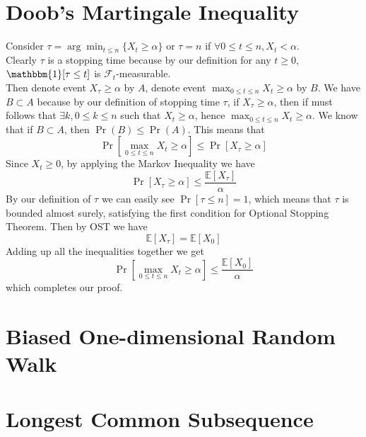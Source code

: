 \documentclass[12pt,letterpaper]{article}
\begin{document}
\section{Doob's Martingale Inequality}
Consider $\tau=\arg\min_{t\leq n}\{X_t\geq\alpha\}$ or $\tau=n$ if $\forall 0\leq t\leq n, X_t<\alpha$.\\
Clearly $\tau$ is a stopping time because by our definition 
for any $t\geq 0$, $\mathbbm{1}[\tau\leq t]$ is $\mathcal{F}_t$-measurable.\\
Then denote event $X_{\tau}\geq\alpha$ by $A$,
denote event $\max_{0\leq t\leq n}X_t\geq\alpha$ by $B$.
We have $B\subset A$ because by our definition of stopping time $\tau$,
if $X_{\tau}\geq\alpha$,
then if must follows that $\exists k, 0\leq k\leq n$ such that $X_t\geq\alpha$,
hence $\max_{0\leq t\leq n}X_t\geq\alpha$.
We know that if $B\subset A$, then $\Pr(B)\leq\Pr(A)$.
This means that
$$\Pr \left[\max_{0\leq t\leq n}X_t\geq\alpha\right]\leq \Pr\left[X_{\tau}\geq\alpha\right]$$
Since $X_t\geq 0$, by applying the Markov Inequality we have
$$\Pr\left[X_{\tau}\geq\alpha\right]\leq \frac{\mathbb{E}\left[X_{\tau}\right]}{\alpha}$$
By our definition of $\tau$ we can easily see $\Pr[\tau\leq n]=1$,
which means that $\tau$ is bounded almost surely,
satisfying the first condition for Optional Stopping Theorem.
Then by OST we have
$$\mathbb{E}[X_{\tau}]=\mathbb{E}[{X_0}]$$
Adding up all the inequalities together we get 
$$\Pr \left[\max_{0\leq t\leq n}X_t\geq\alpha\right]\leq \frac{\mathbb{E}\left[X_{0}\right]}{\alpha}$$
which completes our proof.

\section{Biased One-dimensional Random Walk}

\section{Longest Common Subsequence}
\end{document}
